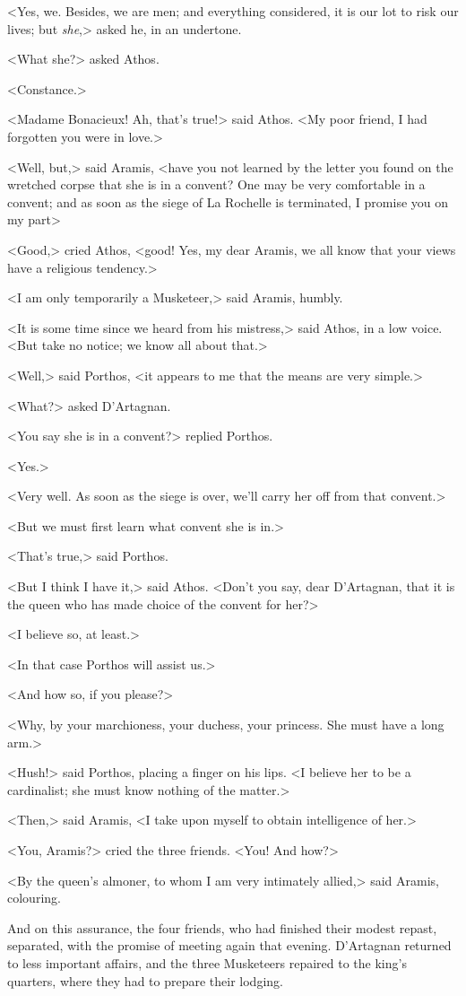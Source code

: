 <Yes, we. Besides, we are men; and everything considered, it is our lot to risk our lives; but \emph{she},> asked he, in an undertone. 

<What she?> asked Athos. 

<Constance.> 

<Madame Bonacieux! Ah, that's true!> said Athos. <My poor friend, I had forgotten you were in love.> 

<Well, but,> said Aramis, <have you not learned by the letter you found on the wretched corpse that she is in a convent? One may be very comfortable in a convent; and as soon as the siege of La Rochelle is terminated, I promise you on my part\longdash> 

<Good,> cried Athos, <good! Yes, my dear Aramis, we all know that your views have a religious tendency.> 

<I am only temporarily a Musketeer,> said Aramis, humbly. 

<It is some time since we heard from his mistress,> said Athos, in a low voice. <But take no notice; we know all about that.> 

<Well,> said Porthos, <it appears to me that the means are very simple.> 

<What?> asked D'Artagnan. 

<You say she is in a convent?> replied Porthos. 

<Yes.> 

<Very well. As soon as the siege is over, we'll carry her off from that convent.> 

<But we must first learn what convent she is in.> 

<That's true,> said Porthos. 

<But I think I have it,> said Athos. <Don't you say, dear D'Artagnan, that it is the queen who has made choice of the convent for her?> 

<I believe so, at least.> 

<In that case Porthos will assist us.> 

<And how so, if you please?> 

<Why, by your marchioness, your duchess, your princess. She must have a long arm.> 

<Hush!> said Porthos, placing a finger on his lips. <I believe her to be a cardinalist; she must know nothing of the matter.> 

<Then,> said Aramis, <I take upon myself to obtain intelligence of her.> 

<You, Aramis?> cried the three friends. <You! And how?> 

<By the queen's almoner, to whom I am very intimately allied,> said Aramis, colouring. 

And on this assurance, the four friends, who had finished their modest repast, separated, with the promise of meeting again that evening. D'Artagnan returned to less important affairs, and the three Musketeers repaired to the king's quarters, where they had to prepare their lodging. 
